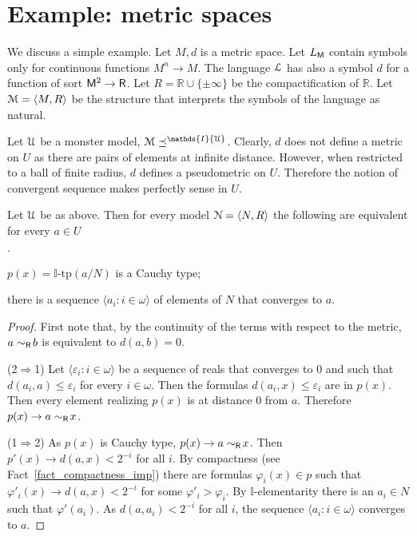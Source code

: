 \documentclass[11pt,oneside]{amsart}
\newcommand{\mylabel}[1]{{#1}\hfill}
\renewenvironment{itemize}
  {\begin{list}{$\cdot$}{%
  \setlength{\parskip}{0mm}
  \setlength{\topsep}{.2\baselineskip}
  \setlength{\rightmargin}{0mm}
  \setlength{\listparindent}{0mm}
  \setlength{\itemindent}{0mm}
  \setlength{\labelwidth}{3ex}
  \setlength{\itemsep}{.2\baselineskip}
  \setlength{\parsep}{.2\baselineskip}
  \setlength{\partopsep}{0mm}
  \setlength{\labelsep}{1ex}
  \setlength{\leftmargin}{\labelwidth+\labelsep}
  \let\makelabel\mylabel}}{%
\end{list}}
\begin{document}
\section{Example: metric spaces}

We discuss a simple example.
Let $M,d$ is a metric space.
Let $L_{\sf M}$ contain symbols only for continuous functions $M^n\to M$.
The language ${\EuScript L}$ has also a symbol $d$ for a function of sort ${\sf M}^2\to {\sf R}$.
Let $R=\mathds{R}\cup\{\pm\infty\}$ be the compactification of $\mathds{R}$.
Let ${\EuScript M}=\langle M,R\rangle$ be the structure that interprets the symbols of the language as natural.

Let ${\EuScript U}$ be a monster model, ${\EuScript M}\preceq^\mathds{I}{\EuScript U}$.
Clearly, $d$ does not define a metric on $U$ as there are pairs of elements at infinite distance.
However, when restricted to a ball of finite radius, $d$ defines a pseudometric on  $U$.
Therefore the notion of convergent sequence makes perfectly sense in $U$.

\begin{fact}
  Let $ {\EuScript U}$ be as above.
  Then for every model ${\EuScript N}=\langle N,R\rangle$ the following are equivalent for every $a\in U$
  \begin{itemize}
    \item[1.] $p(x)=\mathds{I}\mbox{-tp}(a/N)$ is a Cauchy type;
    \item[2.] there is a sequence $\langle a_i: i\in\omega\rangle$ of elements of $N$ that converges to $a$.
  \end{itemize} 
\end{fact}

\begin{proof}
  First note that, by the continuity of the terms with respect to the metric, $a\sim_{\sf R}\!b$ is equivalent to $d(a,b)=0$.

  (2$\Rightarrow$1) 
  Let $\langle \varepsilon_i: i\in\omega\rangle$ be a sequence of reals that converges to $0$ and such that $d(a_i,a)\le\varepsilon_i$ for every $i\in\omega$.
  Then the formulas $d(a_i,x)\le\varepsilon_i$ are in $p(x)$.
  Then every element realizing $p(x)$ is at distance $0$ from $a$.
  Therefore  $p(x)\rightarrow a\sim_{\sf R}\!x$.


  (1$\Rightarrow$2) 
  As $p(x)$ is Cauchy type, $p(x)\rightarrow a\sim_{\sf R}\!x$.
  Then $p'(x)\rightarrow d(a,x)<2^{-i}$ for all $i$.
  By compactness (see Fact~\ref{fact_compactness_imp}) there are formulas $\varphi_i(x)\in p$ such that $\varphi'_i(x)\rightarrow d(a,x)<2^{-i}$ for some $\varphi'_i>\varphi_i$.
  By $\mathds{I}$-elementarity there is an $a_i\in N$ such that $\varphi'(a_i)$.
  As $d(a,a_i)<2^{-i}$ for all $i$, the sequence $\langle a_i: i\in\omega\rangle$ converges to $a$.
\end{proof}
\end{document}
